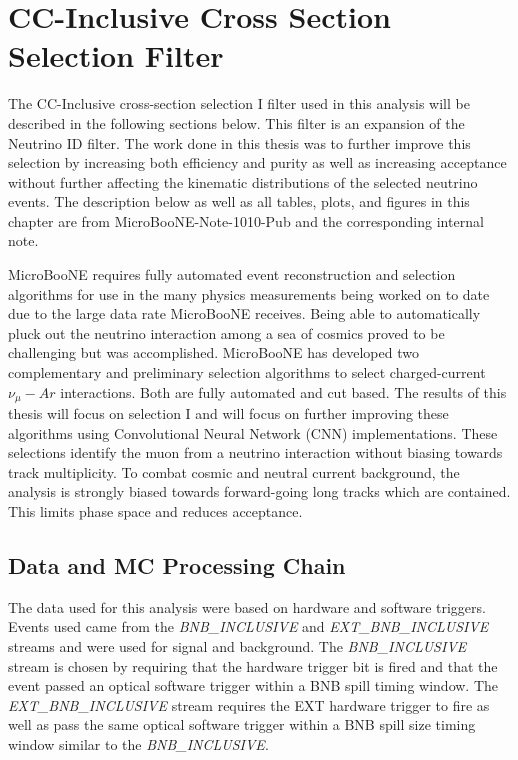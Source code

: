 \chapter{CC-Inclusive Cross Section Selection Filter} \label{ch:meas}
The CC-Inclusive cross-section selection I filter used in this analysis will be described in the following sections below. This filter is an expansion of the Neutrino ID filter. The work done in this thesis was to further improve this selection by increasing both efficiency and purity as well as increasing acceptance without further affecting the kinematic distributions of the selected neutrino events. The description below as well as all tables, plots, and figures in this chapter are from MicroBooNE-Note-1010-Pub \cite{cc-inclusive} and the corresponding internal note. 
 
MicroBooNE requires fully automated event reconstruction and selection algorithms for use in the many physics measurements being worked on to date due to the large data rate MicroBooNE receives. Being able to automatically pluck out the neutrino interaction among a sea of cosmics proved to be challenging but was accomplished. MicroBooNE has developed two complementary and preliminary selection algorithms to select charged-current $\nu_{\mu}-Ar$ interactions. Both are fully automated and cut based. The results of this thesis will focus on selection I and will focus on further improving these algorithms using Convolutional Neural Network (CNN) implementations. These selections identify the muon from a neutrino interaction without biasing towards track multiplicity. To combat cosmic and neutral current background, the analysis is strongly biased towards forward-going long tracks which are contained. This limits phase space and reduces acceptance. 

\section{Data and MC Processing Chain}
The data used for this analysis were based on hardware and software triggers. Events used came from the \textit{BNB\_INCLUSIVE} and \textit{EXT\_BNB\_INCLUSIVE} streams and were used for signal and background. The \textit{BNB\_INCLUSIVE} stream is chosen by requiring that the hardware trigger bit is fired and that the event passed an optical software trigger within a BNB spill timing window. The \textit{EXT\_BNB\_INCLUSIVE} stream requires the EXT hardware trigger to fire as well as pass the same optical software trigger within a BNB spill size timing window similar to the \textit{BNB\_INCLUSIVE}. 


